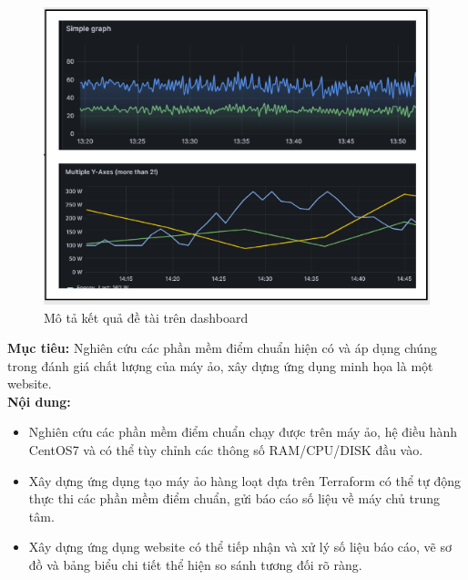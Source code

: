 \documentclass{IEEEtran}
\begin{document}
\begin{figure}[h!]
  \centering
  \includegraphics[scale=0.5]{imgs/grafana-dashboard.png}
  \caption{Mô tả kết quả đề tài trên dashboard}
  \label{fig:grafana-dashboard}
\end{figure}
\textbf{Mục tiêu:} Nghiên cứu các phần mềm điểm chuẩn hiện có\cite*{Passmark2023Performancetest, Axboe2023fio, Iozone2016Benchmark, OOKLA2023Speedtest} và áp dụng chúng trong đánh giá chất lượng của máy ảo, xây dựng ứng dụng minh họa là một website. \\

\textbf{Nội dung:}
\begin{itemize}
  \item Nghiên cứu các phần mềm điểm chuẩn\cite*{Passmark2023Performancetest, Axboe2023fio, Iozone2016Benchmark, OOKLA2023Speedtest} chạy được trên máy ảo, hệ điều hành CentOS7 và có thể tùy chỉnh các thông số RAM/CPU/DISK đầu vào.
  \item Xây dựng ứng dụng tạo máy ảo hàng loạt dựa trên Terraform \cite*{zadka2022terraform} có thể tự động thực thi các phần mềm điểm chuẩn, gửi báo cáo số liệu về máy chủ trung tâm.
  \item Xây dựng ứng dụng website có thể tiếp nhận và xử lý số liệu báo cáo, vẽ sơ đồ và bảng biểu chi tiết thể hiện so sánh tương đối rõ ràng.
\end{itemize} 
\end{document}
